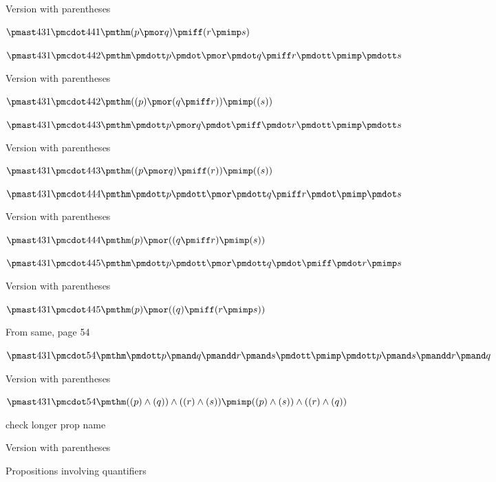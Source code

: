 \documentclass[12pt]{article}
\begin{document}
Version with parentheses

$\pmast 431 \pmcdot 441 \pmthm  (  p \pmor q  ) \pmiff (  r \pmimp s)$


$\pmast 431 \pmcdot 442 \pmthm \pmdott p \pmdot \pmor \pmdot q \pmiff r \pmdott \pmimp \pmdott s$
 
 

Version with parentheses

$\pmast 431 \pmcdot 442 \pmthm  ((  p  ) \pmor (  q \pmiff r  )) \pmimp ((  s))$


$\pmast 431 \pmcdot 443 \pmthm \pmdott p \pmor q \pmdot \pmiff \pmdot r \pmdott \pmimp \pmdott s$
 
 

Version with parentheses

$\pmast 431 \pmcdot 443 \pmthm  ((  p \pmor q  ) \pmiff (  r  )) \pmimp ((  s))$


$\pmast 431 \pmcdot 444 \pmthm \pmdott p \pmdott \pmor \pmdott q \pmiff r \pmdot \pmimp \pmdot s$
 
 

Version with parentheses

$\pmast 431 \pmcdot 444 \pmthm  (  p  ) \pmor ((  q \pmiff r  ) \pmimp (  s))$


$\pmast 431 \pmcdot 445 \pmthm \pmdott p \pmdott \pmor \pmdott q \pmdot \pmiff \pmdot r \pmimp s$
 
 

Version with parentheses

$\pmast 431 \pmcdot 445 \pmthm  (  p  ) \pmor ((  q  ) \pmiff (  r \pmimp s))$


From same, page 54

$\pmast 431 \pmcdot 54 \pmthm \pmdott p \pmand q \pmandd r \pmand s \pmdott \pmimp \pmdott p \pmand s \pmandd r \pmand q $
 
 

Version with parentheses

$\pmast 431 \pmcdot 54 \pmthm  ((  p ) \land ( q )) \land (( r ) \land ( s  )) \pmimp ((  p ) \land ( s )) \land (( r ) \land ( q  ))$


check longer prop name

 
 

Version with parentheses



Propositions involving quantifiers
\end{document}
